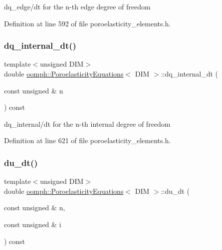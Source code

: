dq\+\_\+edge/dt for the n-\/th edge degree of freedom 



Definition at line 592 of file poroelasticity\+\_\+elements.\+h.

\mbox{\label{classoomph_1_1PoroelasticityEquations_a0840e15b074162843932f724018e77c6}} 
\subsubsection{\texorpdfstring{dq\+\_\+internal\+\_\+dt()}{dq\_internal\_dt()}}
{\footnotesize\ttfamily template$<$unsigned D\+IM$>$ \\
double \hyperlink{classoomph_1_1PoroelasticityEquations}{oomph\+::\+Poroelasticity\+Equations}$<$ D\+IM $>$\+::dq\+\_\+internal\+\_\+dt (\begin{DoxyParamCaption}\item[{const unsigned \&}]{n }\end{DoxyParamCaption}) const\hspace{0.3cm}{\ttfamily [inline]}}



dq\+\_\+internal/dt for the n-\/th internal degree of freedom 



Definition at line 621 of file poroelasticity\+\_\+elements.\+h.

\mbox{\label{classoomph_1_1PoroelasticityEquations_ad8e67101cbc50878375025722745675c}} 
\subsubsection{\texorpdfstring{du\+\_\+dt()}{du\_dt()}}
{\footnotesize\ttfamily template$<$unsigned D\+IM$>$ \\
double \hyperlink{classoomph_1_1PoroelasticityEquations}{oomph\+::\+Poroelasticity\+Equations}$<$ D\+IM $>$\+::du\+\_\+dt (\begin{DoxyParamCaption}\item[{const unsigned \&}]{n,  }\item[{const unsigned \&}]{i }\end{DoxyParamCaption}) const\hspace{0.3cm}{\ttfamily [inline]}}



